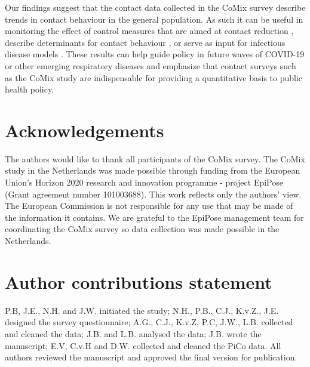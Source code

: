 \documentclass[fleqn,10pt]{wlscirep}
\begin{document}
Our findings suggest that the contact data collected in the CoMix survey describe trends in contact behaviour in the general population. As such it can be useful in monitoring the effect of control measures that are aimed at contact reduction \cite{Coletti_2020, Jarvis_2021, Gimma_2022}, describe determinants for contact behaviour \cite{Wambua_2022, Wong_2022a}, or serve as input for infectious disease models \cite{Coletti_2021, Munday_2021, Franco_2022}. These results can help guide policy in future waves of COVID-19 or other emerging respiratory diseases and emphasize that contact surveys such as the CoMix study are indispensable for providing a quantitative basis to public health policy.








\section*{Acknowledgements}

The authors would like to thank all participants of the CoMix survey. The CoMix study in the Netherlands was made possible through funding from the European Union's Horizon 2020 research and innovation programme - project EpiPose (Grant agreement number 101003688). This work reflects only the authors’ view. The European Commission is not responsible for any use that may be made of the information it contains. We are grateful to the EpiPose management team for coordinating the CoMix survey so data collection was made possible in the Netherlands. 


\section*{Author contributions statement}

P.B, J.E., N.H. and J.W. initiated the study; N.H., P.B., C.J., K.v.Z., J.E. designed the survey questionnaire; A.G., C.J., K.v.Z, P.C, J.W., L.B. collected and cleaned the data; J.B. and L.B. analysed the data; J.B. wrote the manuscript; E.V, C.v.H and D.W. collected and cleaned the PiCo data. All authors reviewed the manuscript and approved the final version for publication. 
\end{document}
